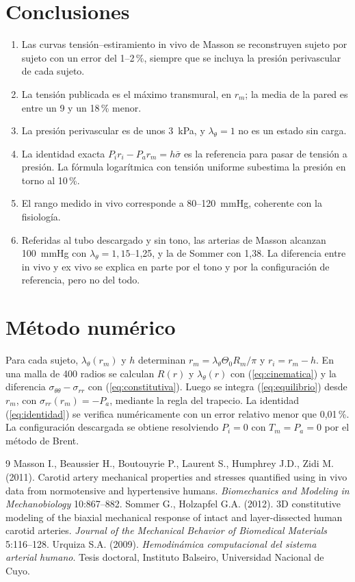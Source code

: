\documentclass[11pt,a4paper]{article}
\newcommand{\stt}{\sigma_{\theta\theta}}
\newcommand{\srr}{\sigma_{rr}}
\newcommand{\lt}{\lambda_\theta}
\begin{document}
\section{Conclusiones}
\begin{enumerate}
\item Las curvas tensión--estiramiento in vivo de Masson se reconstruyen sujeto por sujeto con un error del 1--2\,\%, siempre que se incluya la presión perivascular de cada sujeto.
\item La tensión publicada es el máximo transmural, en $r_m$; la media de la pared es entre un 9 y un 18\,\% menor.
\item La presión perivascular es de unos 3~kPa, y $\lt=1$ no es un estado sin carga.
\item La identidad exacta $P_i r_i-P_a r_m=h\bar\sigma$ es la referencia para pasar de tensión a presión. La fórmula logarítmica con tensión uniforme subestima la presión en torno al 10\,\%.
\item El rango medido in vivo corresponde a 80--120~mmHg, coherente con la fisiología.
\item Referidas al tubo descargado y sin tono, las arterias de Masson alcanzan 100~mmHg con $\lt=1{,}15$--1,25, y la de Sommer con 1,38. La diferencia entre in vivo y ex vivo se explica en parte por el tono y por la configuración de referencia, pero no del todo.
\end{enumerate}

\appendix
\section{Método numérico}
Para cada sujeto, $\lt(r_m)$ y $h$ determinan $r_m=\lt\Theta_0R_m/\pi$ y $r_i=r_m-h$. En una malla de 400 radios se calculan $R(r)$ y $\lt(r)$ con (\ref{eq:cinematica}) y la diferencia $\stt-\srr$ con (\ref{eq:constitutiva}). Luego se integra (\ref{eq:equilibrio}) desde $r_m$, con $\srr(r_m)=-P_a$, mediante la regla del trapecio. La identidad (\ref{eq:identidad}) se verifica numéricamente con un error relativo menor que 0,01\,\%. La configuración descargada se obtiene resolviendo $P_i=0$ con $T_m=P_a=0$ por el método de Brent.

\begin{thebibliography}{9}
 Masson I., Beaussier H., Boutouyrie P., Laurent S., Humphrey J.D., Zidi M. (2011). Carotid artery mechanical properties and stresses quantified using in vivo data from normotensive and hypertensive humans. \emph{Biomechanics and Modeling in Mechanobiology} 10:867--882.
 Sommer G., Holzapfel G.A. (2012). 3D constitutive modeling of the biaxial mechanical response of intact and layer-dissected human carotid arteries. \emph{Journal of the Mechanical Behavior of Biomedical Materials} 5:116--128.
 Urquiza S.A. (2009). \emph{Hemodinámica computacional del sistema arterial humano}. Tesis doctoral, Instituto Balseiro, Universidad Nacional de Cuyo.
\end{thebibliography}
\end{document}
